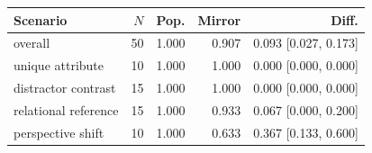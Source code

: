 \begin{tabular}{lrrrr}
\toprule
Scenario & $N$ & Pop. & Mirror & Diff. \\
\midrule
overall & 50 & 1.000 & 0.907 & 0.093 [0.027, 0.173] \\
unique attribute & 10 & 1.000 & 1.000 & 0.000 [0.000, 0.000] \\
distractor contrast & 15 & 1.000 & 1.000 & 0.000 [0.000, 0.000] \\
relational reference & 15 & 1.000 & 0.933 & 0.067 [0.000, 0.200] \\
perspective shift & 10 & 1.000 & 0.633 & 0.367 [0.133, 0.600] \\
\bottomrule
\end{tabular}
